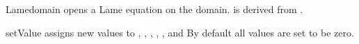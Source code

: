 \begin{classdesc}{Lame}{domain}
opens a Lame equation on the \Domain domain. \Lame is derived from \LinearPDE.
\end{classdesc}
\begin{methoddesc}[Lame]{setValue}{       }
assigns new values to 
,
,
,
,
,
 and
By default all values are set to be zero.
\end{methoddesc}

